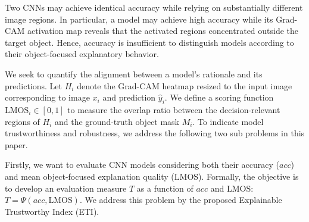 \documentclass[a4paper,fleqn]{cas-dc}
\begin{document}
	Two CNNs may achieve identical accuracy while relying on substantially different image regions. 
	In particular, a model may achieve high accuracy while its Grad-CAM activation map reveals that the activated regions concentrated outside the target object. 
	Hence, accuracy is insufficient to distinguish models according to their object-focused explanatory behavior.
	
	We seek to quantify the alignment between a model's rationale and its predictions. 
	Let $H_i$ denote the Grad-CAM heatmap resized to the input image corresponding to image $x_i$ and prediction $\hat{y}_i$. 
	We define a scoring function $\mathrm{LMOS}_i \in [0, 1]$ to measure the overlap ratio between the decision-relevant regions of $H_i$ and the ground-truth object mask $M_i$. %
	To indicate model trustworthiness and robustness, we address the following two sub problems in this paper.
	
	Firstly, we want to evaluate CNN models considering both their accuracy ($acc$) and mean object-focused explanation quality ($\mathrm{LMOS}$). 
	Formally, the objective is to develop an evaluation measure $T$ as a function of $acc$ and $\mathrm{LMOS}$: $T = \Psi(acc, \mathrm{LMOS})$. 
	We address this problem by the proposed Explainable Trustworthy Index (ETI).
	
\end{document}
